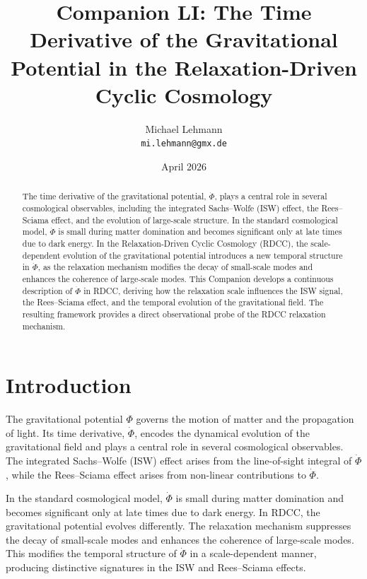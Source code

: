 \documentclass[11pt,a4paper]{article}
\title{\textbf{Companion LI: The Time Derivative of the Gravitational Potential in the Relaxation-Driven Cyclic Cosmology}}
\author{Michael Lehmann \\ \texttt{mi.lehmann@gmx.de}}
\date{April 2026}
\begin{document}
\maketitle

\begin{abstract}
The time derivative of the gravitational potential, $\dot{\Phi}$, plays a central 
role in several cosmological observables, including the integrated Sachs--Wolfe 
(ISW) effect, the Rees--Sciama effect, and the evolution of large-scale structure. 
In the standard cosmological model, $\dot{\Phi}$ is small during matter domination 
and becomes significant only at late times due to dark energy. In the 
Relaxation-Driven Cyclic Cosmology (RDCC), the scale-dependent evolution of the 
gravitational potential introduces a new temporal structure in $\dot{\Phi}$, as the 
relaxation mechanism modifies the decay of small-scale modes and enhances the 
coherence of large-scale modes. This Companion develops a continuous description of 
$\dot{\Phi}$ in RDCC, deriving how the relaxation scale influences the ISW signal, 
the Rees--Sciama effect, and the temporal evolution of the gravitational field. The 
resulting framework provides a direct observational probe of the RDCC relaxation 
mechanism.
\end{abstract}
\section{Introduction}

The gravitational potential $\Phi$ governs the motion of matter and the propagation 
of light. Its time derivative, $\dot{\Phi}$, encodes the dynamical evolution of the 
gravitational field and plays a central role in several cosmological observables. 
The integrated Sachs--Wolfe (ISW) effect arises from the line-of-sight integral of 
$\dot{\Phi}$, while the Rees--Sciama effect arises from non-linear contributions to 
$\dot{\Phi}$.

In the standard cosmological model, $\dot{\Phi}$ is small during matter domination 
and becomes significant only at late times due to dark energy. In RDCC, the 
gravitational potential evolves differently. The relaxation mechanism suppresses the 
decay of small-scale modes and enhances the coherence of large-scale modes. This 
modifies the temporal structure of $\dot{\Phi}$ in a scale-dependent manner, 
producing distinctive signatures in the ISW and Rees--Sciama effects.
\end{document}

